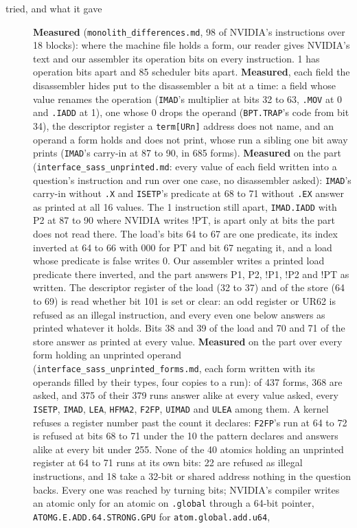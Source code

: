 \begin{description}
\item[{tried, and what it gave}] \textbf{Measured} (\texttt{monolith\_\allowbreak{}differences.\allowbreak{}md}, 98 of NVIDIA's instructions over 18 blocks): where the machine file holds a form, our reader gives NVIDIA's text and our assembler its operation bits on every instruction. 1 has operation bits apart and 85 scheduler bits apart. \textbf{Measured}, each field the disassembler hides put to the disassembler a bit at a time: a field whose value renames the operation (\texttt{IMAD}'s multiplier at bits 32 to 63, \texttt{.\allowbreak{}MOV} at 0 and \texttt{.\allowbreak{}IADD} at 1), one whose 0 drops the operand (\texttt{BPT.\allowbreak{}TRAP}'s code from bit 34), the descriptor register a \texttt{term[URn]} address does not name, and an operand a form holds and does not print, whose run a sibling one bit away prints (\texttt{IMAD}'s carry-in at 87 to 90, in 685 forms). \textbf{Measured} on the part (\texttt{interface\_\allowbreak{}sass\_\allowbreak{}unprinted.\allowbreak{}md}: every value of each field written into a question's instruction and run over one case, no disassembler asked): \texttt{IMAD}'s carry-in without \texttt{.\allowbreak{}X} and \texttt{ISETP}'s predicate at 68 to 71 without \texttt{.\allowbreak{}EX} answer as printed at all 16 values. The 1 instruction still apart, \texttt{IMAD.\allowbreak{}IADD} with P2 at 87 to 90 where NVIDIA writes !PT, is apart only at bits the part does not read there. The load's bits 64 to 67 are one predicate, its index inverted at 64 to 66 with 000 for PT and bit 67 negating it, and a load whose predicate is false writes 0. Our assembler writes a printed load predicate there inverted, and the part answers P1, P2, !P1, !P2 and !PT as written. The descriptor register of the load (32 to 37) and of the store (64 to 69) is read whether bit 101 is set or clear: an odd register or UR62 is refused as an illegal instruction, and every even one below answers as printed whatever it holds. Bits 38 and 39 of the load and 70 and 71 of the store answer as printed at every value. \textbf{Measured} on the part over every form holding an unprinted operand (\texttt{interface\_\allowbreak{}sass\_\allowbreak{}unprinted\_\allowbreak{}forms.\allowbreak{}md}, each form written with its operands filled by their types, four copies to a run): of 437 forms, 368 are asked, and 375 of their 379 runs answer alike at every value asked, every \texttt{ISETP}, \texttt{IMAD}, \texttt{LEA}, \texttt{HFMA2}, \texttt{F2FP}, \texttt{UIMAD} and \texttt{ULEA} among them. A kernel refuses a register number past the count it declares: \texttt{F2FP}'s run at 64 to 72 is refused at bits 68 to 71 under the 10 the pattern declares and answers alike at every bit under 255. None of the 40 atomics holding an unprinted register at 64 to 71 runs at its own bits: 22 are refused as illegal instructions, and 18 take a 32-bit or shared address nothing in the question backs. Every one was reached by turning bits; NVIDIA's compiler writes an atomic only for an atomic on \texttt{.\allowbreak{}global} through a 64-bit pointer, \texttt{ATOMG.\allowbreak{}E.\allowbreak{}ADD.\allowbreak{}64.\allowbreak{}STRONG.\allowbreak{}GPU} for \texttt{atom.\allowbreak{}global.\allowbreak{}add.\allowbreak{}u64}, 
\end{description}
